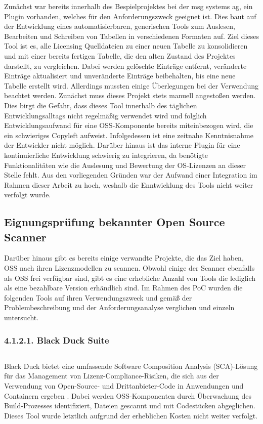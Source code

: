 Zunächst war bereits innerhalb des Bespielprojektes bei der msg systems ag, ein Plugin vorhanden, welches für den Anforderungszweck geeignet ist. Dies baut auf der Entwicklung eines automatisierbaren, generischen Tools zum Auslesen, Bearbeiten und Schreiben von Tabellen in verschiedenen Formaten auf. Ziel dieses Tool ist es, alle Licensing Quelldateien zu einer neuen Tabelle zu konsolidieren und mit einer bereits fertigen Tabelle, die den alten Zustand des Projektes darstellt, zu vergleichen. Dabei werden gelöschte Einträge entfernt, veränderte Einträge aktualisiert und unveränderte Einträge beibehalten, bis eine neue Tabelle erstellt wird. Allerdings mussten einige Überlegungen bei der Verwendung beachtet werden. Zunächst muss dieses Projekt stets manuell angestoßen werden. Dies birgt die Gefahr, dass dieses Tool innerhalb des täglichen Entwicklungsalltags nicht regelmäßig verwendet wird und folglich Entwicklungsaufwand für eine OSS-Komponente bereits miteinbezogen wird, die ein schwieriges Copyleft aufweist. Infolgedessen ist eine zeitnahe Kenntnisnahme der Entwickler nicht möglich. Darüber hinaus ist das interne Plugin für eine kontinuierliche Entwicklung schwierig zu integrieren, da benötigte Funktionalitäten wie die Auslesung und Bewertung der OS-Lizenzen an dieser Stelle fehlt. Aus den vorliegenden Gründen war der Aufwand einer Integration im Rahmen dieser Arbeit zu hoch, weshalb die Enntwicklung des Tools nicht weiter verfolgt wurde.  

\subsection{Eignungsprüfung bekannter Open Source Scanner}

Darüber hinaus gibt es bereits einige verwandte Projekte, die das Ziel haben, OSS nach ihren Lizenzmodellen zu scannen. Obwohl einige der Scanner ebenfalls als OSS frei verfügbar sind, gibt es eine erhebliche Anzahl von Tools die lediglich als eine bezahlbare Version erhändlich sind. Im Rahmen des PoC wurden die folgenden Tools auf ihren Verwendungszweck und gemäß der Problembeschreibung und der Anforderungsanalyse verglichen und einzeln untersucht.

\subsubsection{4.1.2.1. Black Duck Suite} $~$

Black Duck bietet eine umfassende Software Composition Analysis (SCA)-Lösung für das Management von Lizenz-Compliance-Risiken, die sich aus der Verwendung von Open-Source- und Drittanbieter-Code in Anwendungen und Containern ergeben \cite{synopsys_black_2021}. Dabei werden OSS-Komponenten durch Überwachung des Build-Prozesses identifiziert, Dateien gescannt und mit Codestücken abgeglichen. Dieses Tool wurde letztlich aufgrund der erheblichen Kosten nicht weiter verfolgt.

